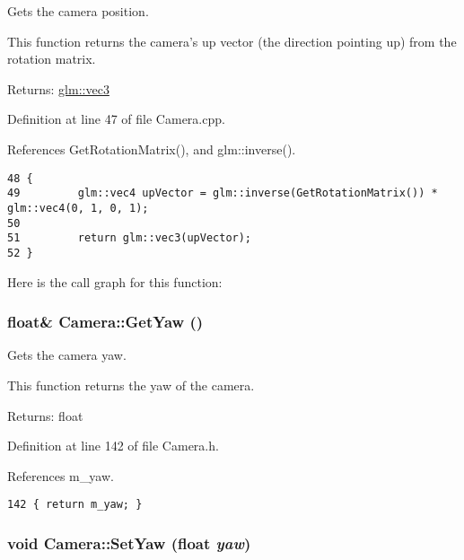Gets the camera position. 

This function returns the camera's up vector (the direction pointing up) from the rotation matrix.

\begin{Desc}
\item[Returns:]\hyperlink{group__core__types_g1c47e8b3386109bc992b6c48e91b0be7}{glm::vec3} \end{Desc}


Definition at line 47 of file Camera.cpp.

References GetRotationMatrix(), and glm::inverse().

\begin{Code}\begin{verbatim}48 {
49         glm::vec4 upVector = glm::inverse(GetRotationMatrix()) * glm::vec4(0, 1, 0, 1);
50 
51         return glm::vec3(upVector);
52 }
\end{verbatim}
\end{Code}




Here is the call graph for this function:\hypertarget{class_camera_614e2fb59605eaff3d57be570805a1c2}{
\subsubsection[GetYaw]{\setlength{\rightskip}{0pt plus 5cm}float\& Camera::GetYaw ()}}
\label{class_camera_614e2fb59605eaff3d57be570805a1c2}


Gets the camera yaw. 

This function returns the yaw of the camera.

\begin{Desc}
\item[Returns:]float \end{Desc}


Definition at line 142 of file Camera.h.

References m\_\-yaw.

\begin{Code}\begin{verbatim}142 { return m_yaw; }
\end{verbatim}
\end{Code}


\hypertarget{class_camera_0f3853ee0b4a1c1fcf3c136decbbe056}{
\subsubsection[SetYaw]{\setlength{\rightskip}{0pt plus 5cm}void Camera::SetYaw (float {\em yaw})}}
\label{class_camera_0f3853ee0b4a1c1fcf3c136decbbe056}


